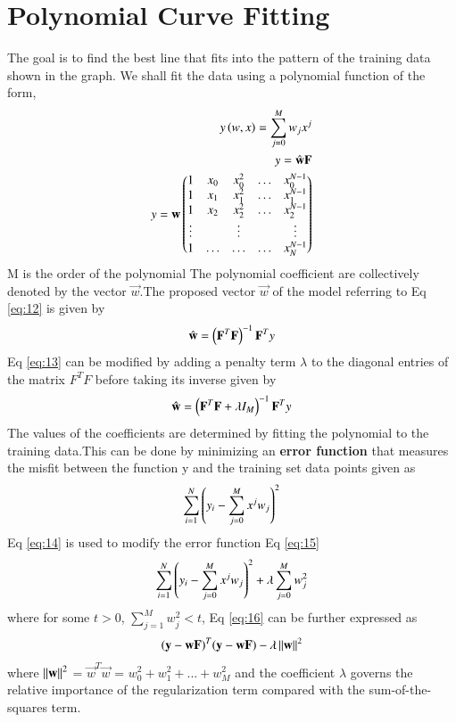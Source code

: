 \documentclass[journal,12pt,twocolumn]{IEEEtran}
\begin{document}
\section{Polynomial Curve Fitting}
The goal is to find the best line that fits into the  pattern of the training data shown in the graph.
We shall fit the data using a polynomial function of the form, 
\begin{align}
     y\left(w,x\right)= \sum_{j=0}^{M} w_j x^{j}\\
     y = \hat{\mathbf{w}}\mathbf{F}\\
     y = \mathbf{w}\begin{pmatrix} 1 & x_{0} & x_{0}^2 & \ldots & x_{0}^{N-1} \\
		1 & x_{1} & x_{1}^2 & \ldots & x_{1}^{N-1} \\
		1 & x_{2} & x_{2}^2 & \ldots & x_{2}^{N-1} \\
		\vdots & & \vdots &  & \vdots  \\
		    1 & \ldots & \ldots & \ldots & x_{N}^{N-1} \end{pmatrix}
\end{align}
M is the order of the polynomial
The polynomial coefficient are collectively denoted by the vector $\vec{w}$.The proposed vector $\vec{w}$ of the model referring to Eq \eqref{eq:12} is given by 
\begin{align}
    \hat{\mathbf{w}} = \left(\mathbf{F}^T\mathbf{F}\right)^{-1}\mathbf{F}^Ty \label{eq:13}
\end{align}
Eq \eqref{eq:13} can be modified by adding a penalty term $\lambda$ to the diagonal entries of the matrix $F^{T}F$ before taking its inverse given by
\begin{align}
     \hat{\mathbf{w}} = \left(\mathbf{F}^T\mathbf{F} + \lambda I_{M}\right)^{-1}\mathbf{F}^Ty \label{eq:14}
\end{align}
The values of the coefficients are determined by fitting the polynomial to the
training data.This can be done by minimizing an \textbf{error function} that measures the
misfit between the function y and the training set data points given as
\begin{align}
    \sum_{i=1}^{N}\left(y_{i} - \sum_{j=0}^{M}x^{j}w_{j}\right)^2 \label{eq:15}
\end{align}
Eq \eqref{eq:14} is used to modify the error function Eq \eqref{eq:15}
\begin{align}
    \sum_{i=1}^{N}\left(y_{i} - \sum_{j=0}^{M}x^{j}w_{j}\right)^2 + \lambda\sum_{j=0}^{M}w_{j}^2\label{eq:16}
\end{align}
where for some  $t>0$, $\sum_{j=1}^{M}w_{j}^2<t$, 
Eq \eqref{eq:16} can be further expressed as
\begin{align}
    (\mathbf{y} - \mathbf{wF})^T(\mathbf{y} - \mathbf{wF}) - \lambda\left\lVert\mathbf{w}\right\rVert^2
\end{align}
where $\left\lVert\mathbf{w}\right\rVert^2$ = $\vec{w}^T\vec{w}$ = $w_{0}^2 + w_{1}^2 + ... +w_{M}^2$ and the coefficient $\lambda$ governs the relative importance of the regularization term compared with the sum-of-the-squares term.
\end{document}
